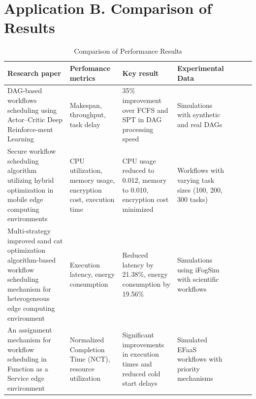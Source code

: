 \documentclass[a4paper, final]{article}
\begin{document}
\section* {Application B. Comparison of Results}
\hypertarget{ApplB}{}
\begin{table}[H]
    \centering
    \caption{Comparison of Performance Results}
    \label{tbl:2}
    \scriptsize
    \begin{tabularx}{\textwidth}{|p{3.5cm}|X|X|X|X|X|X|}
    \hline
    \textbf{Research paper} & \textbf{Perfomance metrics} & \textbf{Key result} & \textbf{Experimental Data} \\
    \hline

    DAG-based workflows scheduling using Actor–Critic Deep Reinforce-ment Learning \cite{bib:1_acrl} &
    Makespan, throughput, task delay &
    35\% improvement over FCFS and SPT in DAG processing speed &
    Simulations with synthetic and real DAGs \\
    \hline

    Secure workflow scheduling algorithm utilizing hybrid optimization in mobile edge computing environments \cite{bib:2_faro} &
    CPU utilization, memory usage, encryption cost, execution time &
    CPU usage reduced to 0.012, memory to 0.010, encryption cost minimized &
    Workflows with varying task sizes (100, 200, 300 tasks) \\
    \hline

    Multi-strategy improved sand cat optimization algorithm-based workflow scheduling mechanism for heterogeneous edge computing environment \cite{bib:3_sandcat} &
    Execution latency, energy consumption &
    Reduced latency by 21.38\%, energy consumption by 19.56\% &
    Simulations using iFogSim with scientific workflows \\
    \hline

    An assignment mechanism for workflow scheduling in Function as a Service edge environment \cite{bib:4_faas} &
    Normalized Completion Time (NCT), resource utilization &
    Significant improvements in execution times and reduced cold start delays &
    Simulated EFaaS workflows with priority mechanisms \\
    \hline


\end{tabularx}
\end{table}
\end{document}
